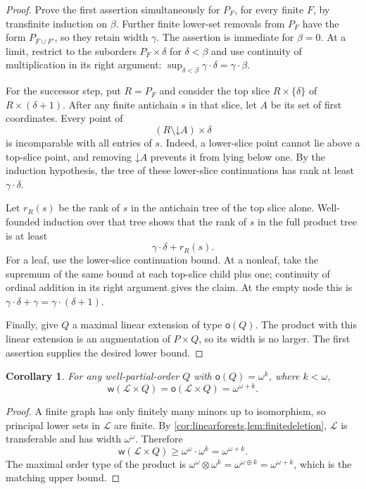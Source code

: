 \documentclass[11pt,letterpaper]{article}
\theoremstyle{plain}
\newtheorem{corollary}[corollary]{Corollary}
\theoremstyle{definition}
\theoremstyle{remark}
\newcommand{\mot}{\mathsf o}
\newcommand{\wid}{\mathsf w}
\newcommand{\LF}{\mathcal L}
\newcommand{\down}{\mathord\downarrow}
\begin{document}
\begin{proof}
Prove the first assertion simultaneously for $P_F$, for every finite
$F$, by transfinite induction on $\beta$. Further finite lower-set
removals from $P_F$ have the form $P_{F\cup F'}$, so they retain width
$\gamma$. The assertion is immediate for $\beta=0$. At a limit,
restrict to the suborders $P_F\times\delta$ for $\delta<\beta$ and
use continuity of multiplication in its right argument:
$\sup_{\delta<\beta}\gamma\cdot\delta=\gamma\cdot\beta$.

For the successor step, put $R=P_F$ and consider the top slice
$R\times\{\delta\}$ of $R\times(\delta+1)$. After any finite
antichain $s$ in that slice, let $A$ be its set of first coordinates.
Every point of
\[
 (R\setminus\down A)\times\delta
\]
is incomparable with all entries of $s$. Indeed, a lower-slice point
cannot lie above a top-slice point, and removing $\down A$ prevents
it from lying below one. By the induction hypothesis, the tree of
these lower-slice continuations has rank at least $\gamma\cdot\delta$.

Let $r_R(s)$ be the rank of $s$ in the antichain tree of the top
slice alone. Well-founded induction over that tree shows that the
rank of $s$ in the full product tree is at least
\[
 \gamma\cdot\delta+r_R(s).
\]
For a leaf, use the lower-slice continuation bound. At a nonleaf,
take the supremum of the same bound at each top-slice child plus one;
continuity of ordinal addition in its right argument gives the
claim. At the empty node this is
$\gamma\cdot\delta+\gamma=\gamma\cdot(\delta+1)$.

Finally, give $Q$ a maximal linear extension of type $\mot(Q)$.
The product with this linear extension is an augmentation of
$P\times Q$, so its width is no larger. The first assertion supplies
the desired lower bound.
\end{proof}

\begin{corollary}\label{cor:LFtransfer}
For any well-partial-order $Q$ with $\mot(Q)=\omega^k$, where
$k<\omega$,
\[
 \wid(\LF\times Q)=\mot(\LF\times Q)=\omega^{\omega+k}.
\]
\end{corollary}

\begin{proof}
A finite graph has only finitely many minors up to isomorphism, so
principal lower sets in $\LF$ are finite. By
\cref{cor:linearforests,lem:finitedeletion}, $\LF$ is transferable and
has width $\omega^\omega$. Therefore
\[
 \wid(\LF\times Q)\ge\omega^\omega\cdot\omega^k
       =\omega^{\omega+k}.
\]
The maximal order type of the product is
$\omega^\omega\otimes\omega^k=\omega^{\omega\oplus k}
=\omega^{\omega+k}$, which is the matching upper bound.
\end{proof}
\end{document}
